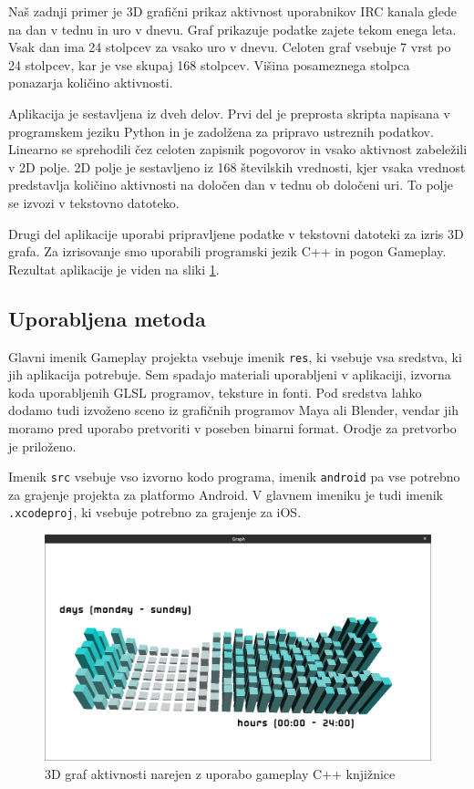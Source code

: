 Naš zadnji primer je 3D grafični prikaz aktivnost uporabnikov IRC kanala glede na dan v tednu in uro v dnevu. Graf prikazuje podatke zajete tekom enega leta. Vsak dan ima 24 stolpcev za vsako uro v dnevu. Celoten graf vsebuje 7 vrst po 24 stolpcev, kar je vse skupaj 168 stolpcev. Višina posameznega stolpca ponazarja količino aktivnosti.

Aplikacija je sestavljena iz dveh delov. Prvi del je preprosta skripta napisana v programskem jeziku Python in je zadolžena za pripravo ustreznih podatkov. Linearno se sprehodili čez celoten zapisnik pogovorov in vsako aktivnost zabeležili v 2D polje. 2D polje je sestavljeno iz 168 številskih vrednosti, kjer vsaka vrednost predstavlja količino aktivnosti na določen dan v tednu ob določeni uri. To polje se izvozi v tekstovno datoteko.

Drugi del aplikacije uporabi pripravljene podatke v tekstovni datoteki za izris 3D grafa. Za izrisovanje smo uporabili programski jezik C++ in pogon Gameplay. Rezultat aplikacije je viden na sliki \ref{cppgraph}.

\subsection{Uporabljena metoda}

Glavni imenik Gameplay projekta vsebuje imenik \texttt{res}, ki vsebuje vsa sredstva, ki jih aplikacija potrebuje. Sem spadajo materiali uporabljeni v aplikaciji, izvorna koda uporabljenih GLSL programov, teksture in fonti. Pod sredstva lahko dodamo tudi izvoženo sceno iz grafičnih programov Maya ali Blender, vendar jih moramo pred uporabo pretvoriti v poseben binarni format. Orodje za pretvorbo je priloženo.

Imenik \texttt{src} vsebuje vso izvorno kodo programa, imenik \texttt{android} pa vse potrebno za grajenje projekta za platformo Android. V glavnem imeniku je tudi imenik \texttt{.xcodeproj}, ki vsebuje potrebno za grajenje za iOS.

\begin{figure}
\begin{center}
\includegraphics[width=12cm]{pic/cpp.png}
\end{center}
\caption{3D graf aktivnosti narejen z uporabo gameplay C++ knjižnice}
\label{cppgraph}
\end{figure}

